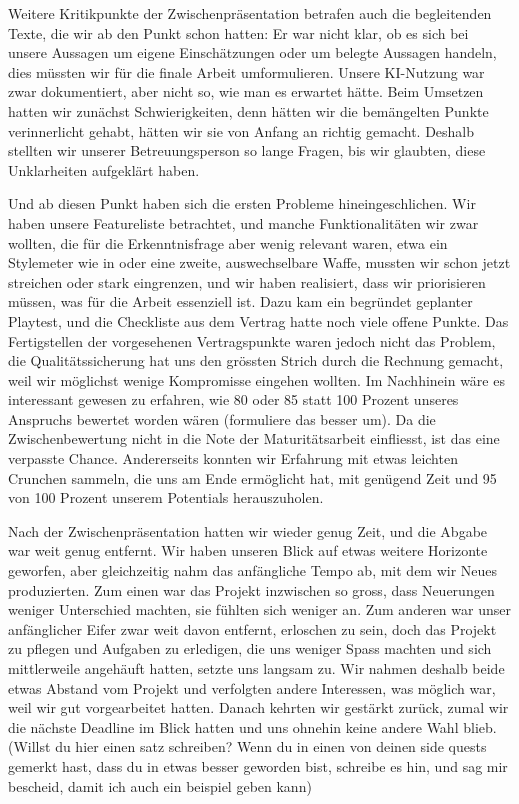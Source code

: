 \documentclass[../Main.tex]{subfiles}
\begin{document}
Weitere Kritikpunkte der Zwischenpräsentation betrafen auch die begleitenden Texte, die wir ab den Punkt schon hatten: Er war nicht klar, ob es sich bei unsere Aussagen um eigene Einschätzungen oder um belegte Aussagen handeln, dies müssten wir für die finale Arbeit umformulieren. Unsere KI-Nutzung war zwar dokumentiert, aber nicht so, wie man es erwartet hätte. Beim Umsetzen hatten wir zunächst Schwierigkeiten, denn hätten wir die bemängelten Punkte verinnerlicht gehabt, hätten wir sie von Anfang an richtig gemacht. Deshalb stellten wir unserer Betreuungsperson so lange Fragen, bis wir glaubten, diese Unklarheiten aufgeklärt haben.

Und ab diesen Punkt haben sich die ersten Probleme hineingeschlichen. Wir haben unsere Featureliste betrachtet, und manche Funktionalitäten wir zwar wollten, die für die Erkenntnisfrage aber wenig relevant waren, etwa ein Stylemeter wie in \autocite{capcom_devilmaycry_2001} oder eine zweite, auswechselbare Waffe, mussten wir schon jetzt streichen oder stark eingrenzen, und wir haben realisiert, dass wir priorisieren müssen, was für die Arbeit essenziell ist. Dazu kam ein begründet geplanter Playtest, und die Checkliste aus dem Vertrag hatte noch viele offene Punkte. Das Fertigstellen der vorgesehenen Vertragspunkte waren jedoch nicht das Problem, die Qualitätssicherung hat uns den grössten Strich durch die Rechnung gemacht, weil wir möglichst wenige Kompromisse eingehen wollten. Im Nachhinein wäre es interessant gewesen zu erfahren, wie 80 oder 85 statt 100 Prozent unseres Anspruchs bewertet worden wären (formuliere das besser um). Da die Zwischenbewertung nicht in die Note der Maturitätsarbeit einfliesst, ist das eine verpasste Chance. Andererseits konnten wir Erfahrung mit etwas leichten Crunchen sammeln, die uns am Ende ermöglicht hat, mit genügend Zeit und 95 von 100 Prozent unserem Potentials herauszuholen.

Nach der Zwischenpräsentation hatten wir wieder genug Zeit, und die Abgabe war weit genug entfernt. Wir haben unseren Blick auf etwas weitere Horizonte geworfen, aber gleichzeitig nahm das anfängliche Tempo ab, mit dem wir Neues produzierten. Zum einen war das Projekt inzwischen so gross, dass Neuerungen weniger Unterschied machten, sie fühlten sich weniger an. Zum anderen war unser anfänglicher Eifer zwar weit davon entfernt, erloschen zu sein, doch das Projekt zu pflegen und Aufgaben zu erledigen, die uns weniger Spass machten und sich mittlerweile angehäuft hatten, setzte uns langsam zu. Wir nahmen deshalb beide etwas Abstand vom Projekt und verfolgten andere Interessen, was möglich war, weil wir gut vorgearbeitet hatten. Danach kehrten wir gestärkt zurück, zumal wir die nächste Deadline im Blick hatten und uns ohnehin keine andere Wahl blieb. (Willst du hier einen satz schreiben? Wenn du in einen von deinen side quests gemerkt hast, dass du in etwas besser geworden bist, schreibe es hin, und sag mir bescheid, damit ich auch ein beispiel geben kann)
\end{document}
